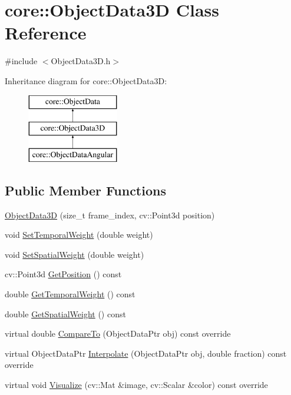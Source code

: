 \hypertarget{classcore_1_1ObjectData3D}{}\section{core\+:\+:Object\+Data3D Class Reference}
\label{classcore_1_1ObjectData3D}


{\ttfamily \#include $<$Object\+Data3\+D.\+h$>$}

Inheritance diagram for core\+:\+:Object\+Data3D\+:\begin{figure}[H]
\begin{center}
\leavevmode
\includegraphics[height=3.000000cm]{classcore_1_1ObjectData3D}
\end{center}
\end{figure}
\subsection*{Public Member Functions}
\begin{DoxyCompactItemize}
\item 
\hyperlink{classcore_1_1ObjectData3D_a47c967cffcbd109f1366069958a71699}{Object\+Data3D} (size\+\_\+t frame\+\_\+index, cv\+::\+Point3d position)
\item 
void \hyperlink{classcore_1_1ObjectData3D_a05eafbd4d963ef14b1068ab5a3818597}{Set\+Temporal\+Weight} (double weight)
\item 
void \hyperlink{classcore_1_1ObjectData3D_a94d4c0d90d4e0999eb2b339d37069cd6}{Set\+Spatial\+Weight} (double weight)
\item 
cv\+::\+Point3d \hyperlink{classcore_1_1ObjectData3D_a0f4a0dca51eb50fdc5baf9714c4a64f6}{Get\+Position} () const
\item 
double \hyperlink{classcore_1_1ObjectData3D_a155e3f4dd2a6adb5d32b61f224092d4b}{Get\+Temporal\+Weight} () const
\item 
double \hyperlink{classcore_1_1ObjectData3D_a896607721c9d12b2e2425fe927f06d6f}{Get\+Spatial\+Weight} () const
\item 
virtual double \hyperlink{classcore_1_1ObjectData3D_abef3e4e7a0dc121d8a403d91964be576}{Compare\+To} (Object\+Data\+Ptr obj) const override
\item 
virtual Object\+Data\+Ptr \hyperlink{classcore_1_1ObjectData3D_ae57a5d8f7a02a403653c82c3b73a73d2}{Interpolate} (Object\+Data\+Ptr obj, double fraction) const override
\item 
virtual void \hyperlink{classcore_1_1ObjectData3D_a86216fae3dc86f1107eb1b4530b574d2}{Visualize} (cv\+::\+Mat \&image, cv\+::\+Scalar \&color) const override
\end{DoxyCompactItemize}


